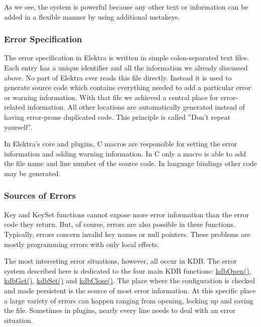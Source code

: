 As we see, the system is powerful because any other text or information can be added in a flexible manner by using additional metakeys.

\subsubsection*{Error Specification}

The error specification in Elektra is written in simple colon-\/separated text files. Each entry has a unique identifier and all the information we already discussed above. No part of Elektra ever reads this file directly. Instead it is used to generate source code which contains everything needed to add a particular error or warning information. With that file we achieved a central place for error-\/related information. All other locations are automatically generated instead of having error-\/prone duplicated code. This principle is called ''Don't repeat yourself''.

In Elektra's core and plugins, C macros are responsible for setting the error information and adding warning information. In C only a macro is able to add the file name and line number of the source code. In language bindings other code may be generated.

\subsubsection*{Sources of Errors}

{\ttfamily Key} and {\ttfamily Key\+Set} functions cannot expose more error information than the error code they return. But, of course, errors are also possible in these functions. Typically, errors concern invalid key names or null pointers. These problems are mostly programming errors with only local effects.

The most interesting error situations, however, all occur in {\ttfamily K\+D\+B}. The error system described here is dedicated to the four main {\ttfamily K\+D\+B} functions\+: {\ttfamily \hyperlink{group__kdb_ga6808defe5870f328dd17910aacbdc6ca}{kdb\+Open()}}, {\ttfamily \hyperlink{group__kdb_ga28e385fd9cb7ccfe0b2f1ed2f62453a1}{kdb\+Get()}}, {\ttfamily \hyperlink{group__kdb_ga11436b058408f83d303ca5e996832bcf}{kdb\+Set()}} and {\ttfamily \hyperlink{group__kdb_gadb54dc9fda17ee07deb9444df745c96f}{kdb\+Close()}}. The place where the configuration is checked and made persistent is the source of most error information. At this specific place a large variety of errors can happen ranging from opening, locking up and saving the file. Sometimes in plugins, nearly every line needs to deal with an error situation.

